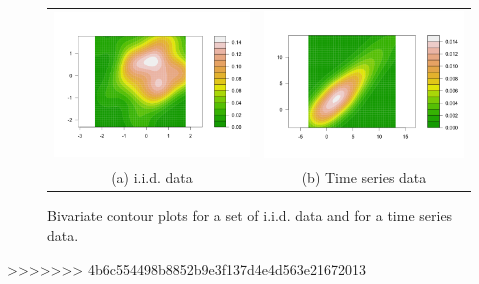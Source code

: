 \begin{figure}
\begin{center}
\begin{tabular}{cc}
\includegraphics[scale=0.25]{./figures/BivariateGaussian} &
\includegraphics[scale=0.25]{./figures/BivariateTimeSerie} \\
(a) i.i.d. data & (b)  Time series data \\
\end{tabular}
\caption{\label{Figure:PreliminariesBivariates}Bivariate contour plots for a set of i.i.d. data and for a time series data. 
}
\end{center}
\end{figure}


>>>>>>> 4b6c554498b8852b9e3f137d4e4d563e21672013
